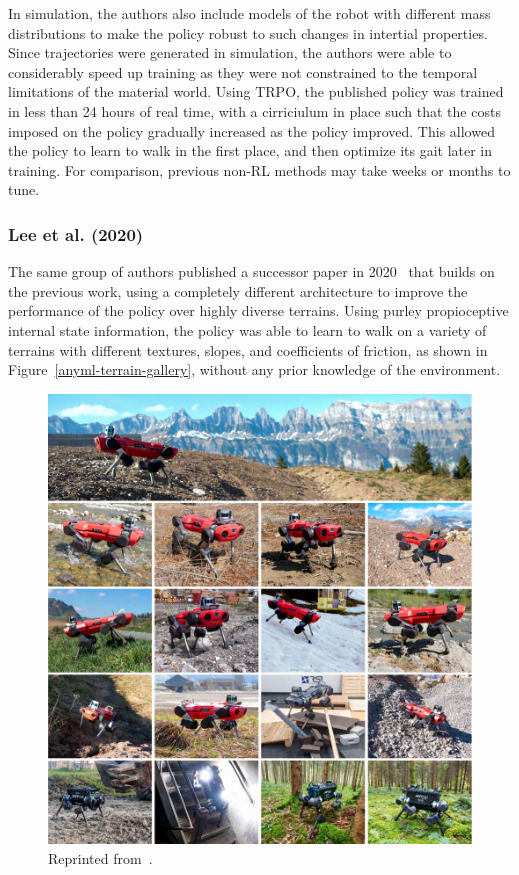 \documentclass[12pt]{report}
\theoremstyle{definition}
\theoremstyle{remark}
\begin{document}
In simulation, the authors also include models of the robot with different mass distributions to make the policy robust to such changes in intertial properties. Since trajectories were generated in simulation, the authors were able to considerably speed up training as they were not constrained to the temporal limitations of the material world. Using TRPO, the published policy was trained in less than 24 hours of real time, with a cirriciulum in place such that the costs imposed on the policy gradually increased as the policy improved. This allowed the policy to learn to walk in the first place, and then optimize its gait later in training. For comparison, previous non-RL methods may take weeks or months to tune.

\subsubsection{Lee et al. (2020)}
The same group of authors published a successor paper in 2020~\cite{lee_learning_2020} that builds on the previous work, using a completely different architecture to improve the performance of the policy over highly diverse terrains. Using purley propioceptive internal state information, the policy was able to learn to walk on a variety of terrains with different textures, slopes, and coefficients of friction, as shown in Figure~\ref{anyml-terrain-gallery}, without any prior knowledge of the environment.
\begin{figure}[H]
    \centering
    \includegraphics[width=\linewidth]{figs/figure1.pdf}
    \caption{Reprinted from~\cite{lee_learning_2020}.}
    \label{fig:anymal-terrain-gallery}
\end{figure}
\end{document}
